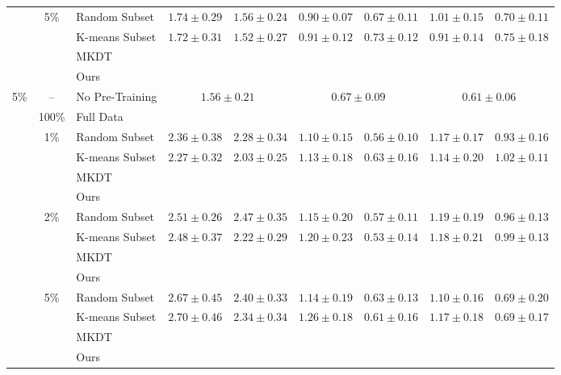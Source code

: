 \begin{table}[t]
{\begin{tabular}{@{}cclcccccc@{}}
& \multirow{4}{*}{5\%} & Random Subset
& $1.74 \pm 0.29$ & $1.56 \pm 0.24$
& $0.90 \pm 0.07$ & $0.67 \pm 0.11$
& $1.01 \pm 0.15$ & $0.70 \pm 0.11$ \\
& & K-means Subset
& $1.72 \pm 0.31$ & $1.52 \pm 0.27$
& $0.91 \pm 0.12$ & $0.73 \pm 0.12$
& $0.91 \pm 0.14$ & $0.75 \pm 0.18$ \\
& & MKDT & & & & & & \\
& & Ours
& &
& &
&  &  \\

\midrule

\multirow{14}{*}{5\%}
& -- & No Pre-Training
& \multicolumn{2}{c}{$1.56 \pm 0.21$}
& \multicolumn{2}{c}{$0.67 \pm 0.09$}
& \multicolumn{2}{c}{$0.61 \pm 0.06$} \\
\cmidrule(lr){2-9}

& 100\% & Full Data
&  & 
&  & 
&  &  \\
\cmidrule(lr){2-9}

& \multirow{4}{*}{1\%} & Random Subset
& $2.36 \pm 0.38$ & $2.28 \pm 0.34$
& $1.10 \pm 0.15$ & $0.56 \pm 0.10$
& $1.17 \pm 0.17$ & $0.93 \pm 0.16$ \\
& & K-means Subset
& $2.27 \pm 0.32$ & $2.03 \pm 0.25$
& $1.13 \pm 0.18$ & $0.63 \pm 0.16$
& $1.14 \pm 0.20$ & $1.02 \pm 0.11$ \\
& & MKDT & & & & & & \\
& & Ours
& &
& &
& & \\
\cmidrule(lr){2-9}

& \multirow{4}{*}{2\%} & Random Subset
& $2.51 \pm 0.26$ & $2.47 \pm 0.35$
& $1.15 \pm 0.20$ & $0.57 \pm 0.11$
& $1.19 \pm 0.19$ & $0.96 \pm 0.13$ \\
& & K-means Subset
& $2.48 \pm 0.37$ & $2.22 \pm 0.29$
& $1.20 \pm 0.23$ & $0.53 \pm 0.14$
& $1.18 \pm 0.21$ & $0.99 \pm 0.13$ \\
& & MKDT & & & & & & \\
& & Ours
& &
& &
&  &  \\
\cmidrule(lr){2-9}

& \multirow{4}{*}{5\%} & Random Subset
& $2.67 \pm 0.45$ & $2.40 \pm 0.33$
& $1.14 \pm 0.19$ & $0.63 \pm 0.13$
& $1.10 \pm 0.16$ & $0.69 \pm 0.20$ \\
& & K-means Subset
& $2.70 \pm 0.46$ & $2.34 \pm 0.34$
& $1.26 \pm 0.18$ & $0.61 \pm 0.16$
& $1.17 \pm 0.18$ & $0.69 \pm 0.17$ \\
& & MKDT & & & & & & \\
& & Ours
&  & 
& &
&  &  \\

\bottomrule
\end{tabular}%
}
\end{table}



